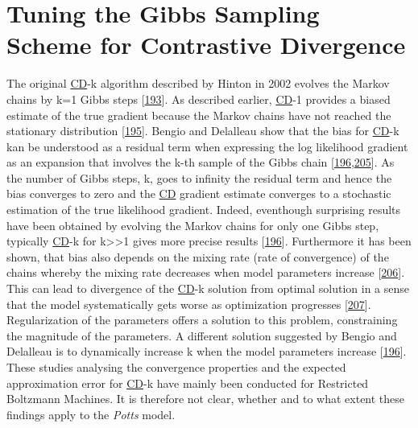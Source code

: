 \documentclass[11pt,a4paper,twoside]{book}
\theoremstyle{definition}
\theoremstyle{definition}
\theoremstyle{remark}
\begin{document}
\section{Tuning the Gibbs Sampling Scheme for Contrastive
Divergence}\label{cd-sampling-optimization}

The original \protect\hyperlink{abbrev}{CD}-k algorithm described by
Hinton in 2002 evolves the Markov chains by k=1 Gibbs steps
{[}\protect\hyperlink{ref-Hinton2002}{193}{]}. As described earlier,
\protect\hyperlink{abbrev}{CD}-1 provides a biased estimate of the true
gradient because the Markov chains have not reached the stationary
distribution {[}\protect\hyperlink{ref-Fischer2012}{195}{]}. Bengio and
Delalleau show that the bias for \protect\hyperlink{abbrev}{CD}-k kan be
understood as a residual term when expressing the log likelihood
gradient as an expansion that involves the k-th sample of the Gibbs
chain
{[}\protect\hyperlink{ref-Bengio2009}{196},\protect\hyperlink{ref-Ma2016}{205}{]}.
As the number of Gibbs steps, k, goes to infinity the residual term and
hence the bias converges to zero and the \protect\hyperlink{abbrev}{CD}
gradient estimate converges to a stochastic estimation of the true
likelihood gradient. Indeed, eventhough surprising results have been
obtained by evolving the Markov chains for only one Gibbs step,
typically \protect\hyperlink{abbrev}{CD}-k for
k\textgreater{}\textgreater{}1 gives more precise results
{[}\protect\hyperlink{ref-Bengio2009}{196}{]}. Furthermore it has been
shown, that bias also depends on the mixing rate (rate of convergence)
of the chains whereby the mixing rate decreases when model parameters
increase {[}\protect\hyperlink{ref-Tieleman2008}{206}{]}. This can lead
to divergence of the \protect\hyperlink{abbrev}{CD}-k solution from
optimal solution in a sense that the model systematically gets worse as
optimization progresses {[}\protect\hyperlink{ref-Fischer2010}{207}{]}.
Regularization of the parameters offers a solution to this problem,
constraining the magnitude of the parameters. A different solution
suggested by Bengio and Delalleau is to dynamically increase k when the
model parameters increase {[}\protect\hyperlink{ref-Bengio2009}{196}{]}.
These studies analysing the convergence properties and the expected
approximation error for \protect\hyperlink{abbrev}{CD}-k have mainly
been conducted for Restricted Boltzmann Machines. It is therefore not
clear, whether and to what extent these findings apply to the
\emph{Potts} model.
\end{document}
